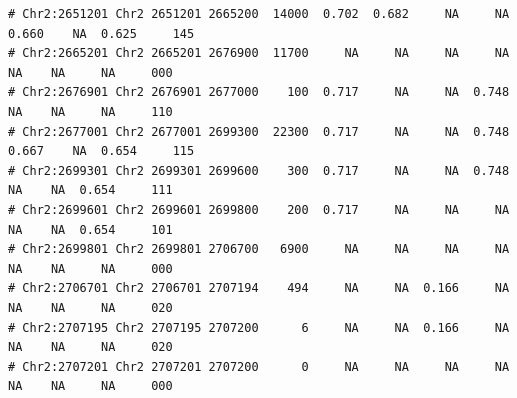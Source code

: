 \documentclass{article}\usepackage[]{graphicx}\usepackage[]{color}
\makeatletter
\newenvironment{kframe}{%
 \def\at@end@of@kframe{}%
 \ifinner\ifhmode%
  \def\at@end@of@kframe{\end{minipage}}%
  \begin{minipage}{\columnwidth}%
 \fi\fi%
 \def\FrameCommand##1{\hskip\@totalleftmargin \hskip-\fboxsep
 \colorbox{shadecolor}{##1}\hskip-\fboxsep
     \hskip-\linewidth \hskip-\@totalleftmargin \hskip\columnwidth}%
 \MakeFramed {\advance\hsize-\width
   \@totalleftmargin\z@ \linewidth\hsize
   \@setminipage}}%
 {\par\unskip\endMakeFramed%
 \at@end@of@kframe}
\newenvironment{knitrout}{}{} %
\makeatother
\begin{document}
\begin{knitrout}
\begin{kframe}
\begin{verbatim}
# Chr2:2651201 Chr2 2651201 2665200  14000  0.702  0.682     NA     NA  0.660    NA  0.625     145
# Chr2:2665201 Chr2 2665201 2676900  11700     NA     NA     NA     NA     NA    NA     NA     000
# Chr2:2676901 Chr2 2676901 2677000    100  0.717     NA     NA  0.748     NA    NA     NA     110
# Chr2:2677001 Chr2 2677001 2699300  22300  0.717     NA     NA  0.748  0.667    NA  0.654     115
# Chr2:2699301 Chr2 2699301 2699600    300  0.717     NA     NA  0.748     NA    NA  0.654     111
# Chr2:2699601 Chr2 2699601 2699800    200  0.717     NA     NA     NA     NA    NA  0.654     101
# Chr2:2699801 Chr2 2699801 2706700   6900     NA     NA     NA     NA     NA    NA     NA     000
# Chr2:2706701 Chr2 2706701 2707194    494     NA     NA  0.166     NA     NA    NA     NA     020
# Chr2:2707195 Chr2 2707195 2707200      6     NA     NA  0.166     NA     NA    NA     NA     020
# Chr2:2707201 Chr2 2707201 2707200      0     NA     NA     NA     NA     NA    NA     NA     000
\end{verbatim}
\end{kframe}


\end{knitrout}
\end{document}
